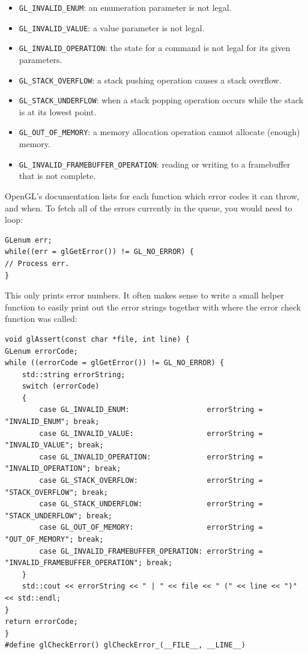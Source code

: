 \documentclass[table, xcdraw]{article}%
\begin{document}
\begin{itemize}
\item \texttt{GL_INVALID_ENUM}: an enumeration parameter is not legal.
\item \texttt{GL_INVALID_VALUE}: a value parameter is not legal.
\item \texttt{GL_INVALID_OPERATION}: the state for a command is not legal for its given parameters.
\item \texttt{GL_STACK_OVERFLOW}: a stack pushing operation causes a stack overflow.
\item \texttt{GL_STACK_UNDERFLOW}: when a stack popping operation occurs while the stack is at its lowest point.
\item \texttt{GL_OUT_OF_MEMORY}: a memory allocation operation cannot allocate (enough) memory.
\item \texttt{GL_INVALID_FRAMEBUFFER_OPERATION}: reading or writing to a framebuffer that is not complete.
\end{itemize}

OpenGL's documentation lists for each function which error codes it can throw, and when. To fetch all of the errors currently in the queue, you would need to loop:

\begin{verbatim}
GLenum err;
while((err = glGetError()) != GL_NO_ERROR) {
// Process err.
}
\end{verbatim}

This only prints error numbers. It often makes sense to write a small helper function to easily print out the error strings together with where the error check function was called: 

\begin{verbatim}
void glAssert(const char *file, int line) {
GLenum errorCode;
while ((errorCode = glGetError()) != GL_NO_ERROR) {
    std::string errorString;
    switch (errorCode)
    {
        case GL_INVALID_ENUM:                  errorString = "INVALID_ENUM"; break;
        case GL_INVALID_VALUE:                 errorString = "INVALID_VALUE"; break;
        case GL_INVALID_OPERATION:             errorString = "INVALID_OPERATION"; break;
        case GL_STACK_OVERFLOW:                errorString = "STACK_OVERFLOW"; break;
        case GL_STACK_UNDERFLOW:               errorString = "STACK_UNDERFLOW"; break;
        case GL_OUT_OF_MEMORY:                 errorString = "OUT_OF_MEMORY"; break;
        case GL_INVALID_FRAMEBUFFER_OPERATION: errorString = "INVALID_FRAMEBUFFER_OPERATION"; break;
    }
    std::cout << errorString << " | " << file << " (" << line << ")" << std::endl;
}
return errorCode;
}
#define glCheckError() glCheckError_(__FILE__, __LINE__) 
\end{verbatim}
\end{document}
